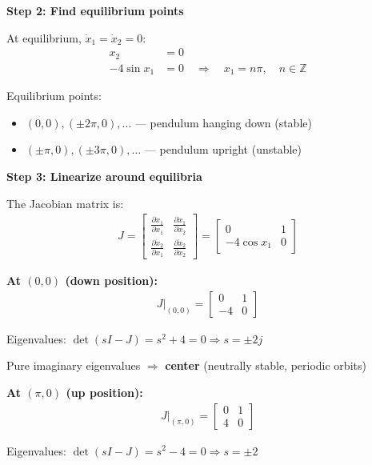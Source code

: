 \documentclass[11pt,a4paper]{article}
\begin{document}
\textbf{Step 2: Find equilibrium points}

At equilibrium, $\dot{x}_1 = \dot{x}_2 = 0$:
\begin{align}
  x_2 &= 0 \\
  -4\sin x_1 &= 0 \quad \Rightarrow \quad x_1 = n\pi, \quad n \in \mathbb{Z}
\end{align}

Equilibrium points:
\begin{itemize}
  \item $(0, 0), (\pm 2\pi, 0), \ldots$ — pendulum hanging down (stable)
  \item $(\pm \pi, 0), (\pm 3\pi, 0), \ldots$ — pendulum upright (unstable)
\end{itemize}

\textbf{Step 3: Linearize around equilibria}

The Jacobian matrix is:
\begin{align}
  J = \begin{bmatrix} \frac{\partial \dot{x}_1}{\partial x_1} & \frac{\partial \dot{x}_1}{\partial x_2} \\ \frac{\partial \dot{x}_2}{\partial x_1} & \frac{\partial \dot{x}_2}{\partial x_2} \end{bmatrix} = \begin{bmatrix} 0 & 1 \\ -4\cos x_1 & 0 \end{bmatrix}
\end{align}

\textbf{At $(0, 0)$ (down position):}
\begin{align}
  J|_{(0,0)} = \begin{bmatrix} 0 & 1 \\ -4 & 0 \end{bmatrix}
\end{align}

Eigenvalues: $\det(sI - J) = s^2 + 4 = 0 \Rightarrow s = \pm 2j$

Pure imaginary eigenvalues $\Rightarrow$ \textbf{center} (neutrally stable, periodic orbits)

\textbf{At $(\pi, 0)$ (up position):}
\begin{align}
  J|_{(\pi,0)} = \begin{bmatrix} 0 & 1 \\ 4 & 0 \end{bmatrix}
\end{align}

Eigenvalues: $\det(sI - J) = s^2 - 4 = 0 \Rightarrow s = \pm 2$
\end{document}
